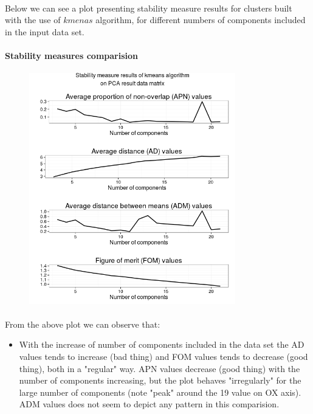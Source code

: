 \documentclass[10pt]{article}\usepackage[]{graphicx}\usepackage[]{color}
\begin{document}
\paragraph{}
Below we can see a plot presenting stability measure results for clusters built with the 
use of $kmenas$ algorithm, for different numbers of components included in the input data set.
\clearpage
\paragraph{Stability measures comparision} 
\begin{figure}[h!]
\centering
\includegraphics[width=0.8\textwidth]{Plots2/pca-stability.png}
\end{figure}
\paragraph{}
From the above plot we can observe that:
\begin{itemize}
\item With the increase of number of components included in the data set the AD values tends to increase (bad thing) and
FOM values tends to decrease (good thing), both in a "regular" way. APN values decrease (good thing) with the number of components increasing, but the plot behaves "irregularly" for the large number of components (note "peak" around the 19 value on OX axis). ADM values does not seem to depict any pattern in this comparision.
\end{itemize}
\end{document}
